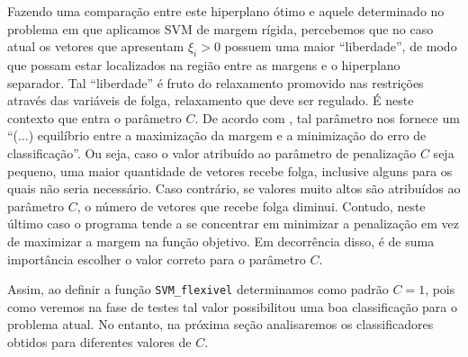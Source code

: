 \documentclass[12pt,a4paper]{scrartcl}
\theoremstyle{definition}%
\begin{document}
Fazendo uma comparação entre este hiperplano ótimo e aquele determinado
no problema em que aplicamos SVM de margem rígida, percebemos que no
caso atual os vetores que apresentam $\xi_{i} > 0$ possuem uma maior
``liberdade'', de modo que possam estar localizados na região entre as
margens e o hiperplano separador. Tal ``liberdade'' é fruto do
relaxamento promovido nas restrições através das variáveis de folga,
relaxamento que deve ser regulado. É neste contexto que entra o
parâmetro $C$. De acordo com \textcite{Evelin2017}, tal parâmetro nos
fornece um ``(...) equilíbrio entre a maximização da margem e a minimização do
erro de classificação''. Ou seja, caso o valor atribuído ao parâmetro de
penalização $C$ seja pequeno, uma maior quantidade de vetores recebe
folga, inclusive alguns para os quais não seria necessário. Caso
contrário, se valores muito altos são atribuídos ao parâmetro $C$, o
número de vetores que recebe folga diminui. Contudo, neste último caso o
programa tende a se concentrar em minimizar a penalização em vez de
maximizar a margem na função objetivo. Em decorrência disso, é de suma
importância escolher o valor correto para o parâmetro $C$.

Assim, ao definir a função \texttt{SVM\_flexivel} determinamos como
padrão $C=1$, pois como veremos na fase de testes tal valor
possibilitou uma boa classificação para o problema atual. No entanto, na
próxima seção analisaremos os classificadores obtidos para diferentes
valores de $C$.
\end{document}
